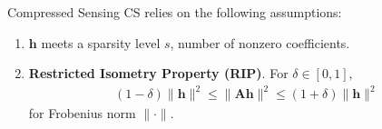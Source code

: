\documentclass{beamer}
\begin{document}

    \begin{frame}{Compressed Sensing}
      CS relies on the following assumptions:
      \begin{enumerate}
        \item $\mathbf h$ meets a sparsity level $s$, number of nonzero coefficients.
        \pause 
        \item \textbf{Restricted Isometry Property (RIP)}. For $\delta \in [0,1],$
        \begin{align*}
          (1-\delta)\| \mathbf h \|^2 \leq \| \mathbf A \mathbf h \|^2 \leq (1+\delta)\| \mathbf h \|^2 
        \end{align*}
        for Frobenius norm $\|\cdot\|$.
      \end{enumerate}
    \end{frame}
\end{document}
